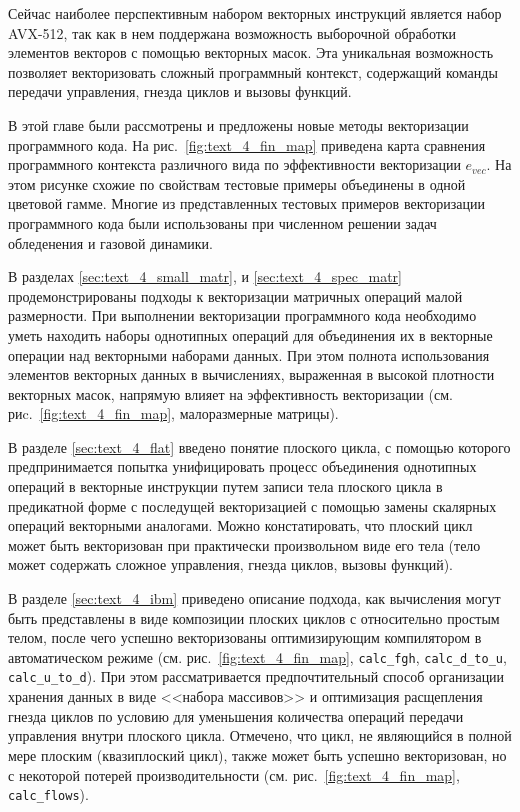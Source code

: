 Сейчас наиболее перспективным набором векторных инструкций является набор AVX-512\label{abbr:avx9}, так как в нем поддержана возможность выборочной обработки элементов векторов с помощью векторных масок\label{term:vector_mask9}.
Эта уникальная возможность позволяет векторизовать сложный программный контекст, содержащий команды передачи управления, гнезда циклов и вызовы функций.

В этой главе были рассмотрены и предложены новые методы векторизации программного кода.
На рис.~\ref{fig:text_4_fin_map} приведена карта сравнения программного контекста различного вида по эффективности векторизации $e_{vec}$.
На этом рисунке схожие по свойствам тестовые примеры объединены в одной цветовой гамме.
Многие из представленных тестовых примеров векторизации программного кода были использованы при численном решении задач обледенения и газовой динамики.

В разделах \ref{sec:text_4_small_matr}, и \ref{sec:text_4_spec_matr} продемонстрированы подходы к векторизации матричных операций малой размерности.
При выполнении векторизации программного кода необходимо уметь находить наборы однотипных операций для объединения их в векторные операции над векторными наборами данных.
При этом полнота использования элементов векторных данных в вычислениях, выраженная в высокой плотности векторных масок\label{term:vector_mask_density7}, напрямую влияет на эффективность векторизации\label{term:vec_eff8} (см. риc.~\ref{fig:text_4_fin_map}, малоразмерные матрицы).

В разделе \ref{sec:text_4_flat} введено понятие плоского цикла\label{term:flat_loop6}, с помощью которого предпринимается попытка унифицировать процесс объединения однотипных операций в векторные инструкции путем записи тела плоского цикла в предикатной форме\label{term:predicate_view5} с последущей векторизацией с помощью замены скалярных операций векторными аналогами.
Можно констатировать, что плоский цикл может быть векторизован при практически произвольном виде его тела (тело может содержать сложное управления, гнезда циклов, вызовы функций).

В разделе \ref{sec:text_4_ibm} приведено описание подхода, как вычисления могут быть представлены в виде композиции плоских циклов с относительно простым телом, после чего успешно векторизованы оптимизирующим компилятором в автоматическом режиме (см. рис.~\ref{fig:text_4_fin_map}, \texttt{calc\_fgh}, \texttt{calc\_d\_to\_u}, \texttt{calc\_u\_to\_d}).
При этом рассматривается предпочтительный способ организации хранения данных в виде <<набора массивов>> и оптимизация расщепления гнезда циклов по условию\label{term:loop_split_by_cond4} для уменьшения количества операций передачи управления внутри плоского цикла.
Отмечено, что цикл, не являющийся в полной мере плоским (квазиплоский цикл)\label{term:flat_kvazy_flat2}, также может быть успешно векторизован, но с некоторой потерей производительности (см. рис.~\ref{fig:text_4_fin_map}, \texttt{calc\_flows}).

